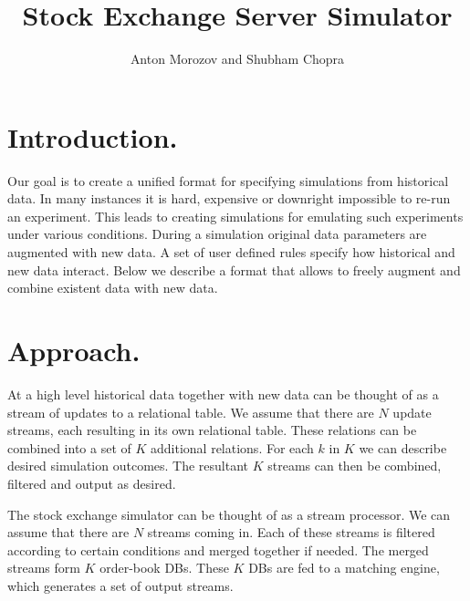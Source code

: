 \documentclass{article}
\begin{document}
    
\title{Stock Exchange Server Simulator}
\author{Anton Morozov and Shubham Chopra}
\maketitle
    
\section{Introduction.}

Our goal is to create a unified format for specifying simulations from historical data. In many instances it is hard, expensive or downright impossible to re-run an experiment. This leads to creating simulations for emulating such experiments under various conditions. During a simulation original data parameters are augmented with new data. A set of user defined rules specify how historical and new data interact. Below we describe a format that allows to freely augment and combine existent data with new data. 


\section{Approach.}

At a high level historical data together with new data can be thought of as a stream of updates to a relational table. We assume that there are $N$ update streams, each resulting in its own relational table. These relations can be combined into a set of $K$ additional relations. For each $k$ in $K$ we can describe desired simulation outcomes. The resultant $K$ streams can then be combined, filtered and output as desired.



The stock exchange simulator can be thought of as a stream processor. We can assume that there are $N$ streams coming in. Each of these streams is filtered according to certain conditions and merged together if needed. The merged streams form $K$ order-book DBs. These $K$ DBs are fed to a matching engine, which generates a set of output streams.
\end{document}
